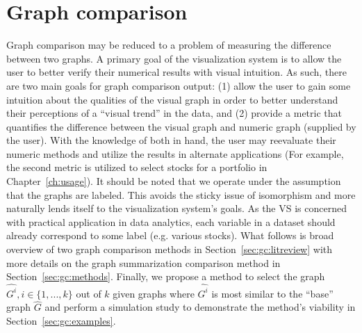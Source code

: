\chapter{Graph comparison \label{ch:gc}}

Graph comparison may be reduced to a problem of measuring the difference 
between two graphs. 
A primary goal of the visualization system is to allow the user to better 
verify their numerical results with visual intuition. As such, there are two 
main goals for graph comparison output: (1) allow the user to gain some 
intuition about the qualities of the visual graph in order to better understand 
their perceptions of a ``visual trend'' in the data, and (2) provide a metric 
that quantifies the difference between the visual graph and numeric graph 
(supplied by the user). With the knowledge of both in hand, the user may 
reevaluate their numeric methods and utilize the results in alternate 
applications (For example, the second metric is utilized to select stocks for a 
portfolio in Chapter~\ref{ch:usage}). It should be noted that we operate under 
the assumption that the graphs are labeled. This avoids the sticky issue of 
isomorphism and more naturally lends itself to the visualization system's 
goals. As the VS is concerned with practical application in data 
analytics, each variable in a dataset should already correspond to some label 
(e.g. various stocks).
What follows is broad overview of two graph comparison methods in 
Section~\ref{sec:gc:litreview} with more details on the graph summarization 
comparison method in Section~\ref{sec:gc:methods}. Finally, we propose a method 
to select the graph $\hat{G^i}, i \in \{1,...,k\}$ out of $k$ given graphs 
where $\hat{G^i}$ is most similar to the ``base'' graph $\hat{G}$ and perform 
a simulation study to demonstrate the method's viability in 
Section~\ref{sec:gc:examples}.



